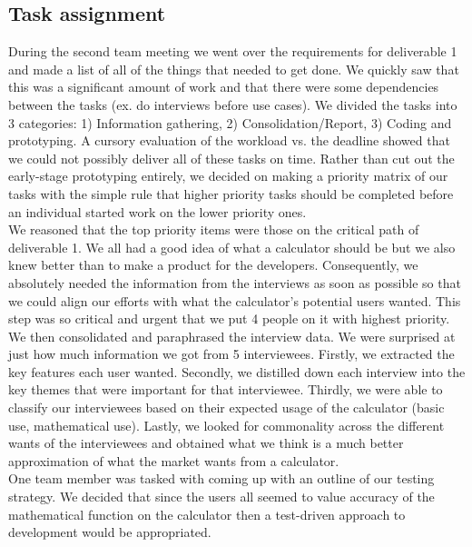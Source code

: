 \documentclass{article}
\begin{document}
\subsection{Task assignment}

During the second team meeting we went over the requirements for deliverable 1 and made a list of all of the things that needed to get done. We quickly saw that this was a significant amount of work and that there were some dependencies between the tasks (ex. do interviews before use cases). We divided the tasks into 3 categories: 1) Information gathering, 2) Consolidation/Report, 3) Coding and prototyping. A cursory evaluation of the workload vs. the deadline showed that we could not possibly deliver all of these tasks on time. Rather than cut out the early-stage prototyping entirely, we decided on making a priority matrix of our tasks with the simple rule that higher priority tasks should be completed before an individual started work on the lower priority ones. \\

We reasoned that the top priority items were those on the critical path of deliverable 1. We all had a good idea of what a calculator should be but we also knew better than to make a product for the developers. Consequently, we absolutely needed the information from the interviews as soon as possible so that we could align our efforts with what the calculator's potential users wanted. This step was so critical and urgent that we put 4 people on it with highest priority. \\

We then consolidated and paraphrased the interview data. We were surprised at just how much information we got from 5 interviewees. Firstly, we extracted the key features each user wanted. Secondly, we distilled down each interview into the key themes that were important for that interviewee. Thirdly, we were able to classify our interviewees based on their expected usage of the calculator (basic use, mathematical use). Lastly, we looked for commonality across the different wants of the interviewees and obtained what we think is a much better approximation of what the market wants from a calculator. \\

One team member was tasked with coming up with an outline of our testing strategy. We decided that since the users all seemed to value accuracy of the mathematical function on the calculator then a test-driven approach to development would be appropriated. \\
\end{document}
